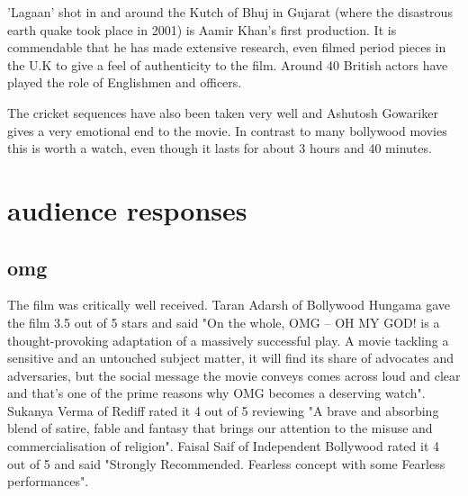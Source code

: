 \documentclass[a4paper]{article}
\begin{document}
'Lagaan' shot in and around the Kutch of Bhuj in Gujarat (where the disastrous earth quake took place in 2001) is Aamir Khan's first production. It is commendable that he has made extensive research, even filmed period pieces in the U.K to give a feel of authenticity to the film. Around 40 British actors have played the role of Englishmen and officers.

The cricket sequences have also been taken very well and Ashutosh Gowariker gives a very emotional end to the movie. In contrast to many bollywood movies this is worth a watch, even though it lasts for about 3 hours and 40 minutes.
	  
	  
	  

\section{audience responses}
\subsection{omg}
	The film was critically well received.
Taran Adarsh of Bollywood Hungama gave the film 3.5 out of 5 stars and said "On the whole, OMG – OH MY GOD! is a thought-provoking adaptation of a massively successful play. A movie tackling a sensitive and an untouched subject matter, it will find its share of advocates and adversaries, but the social message the movie conveys comes across loud and clear and that's one of the prime reasons why OMG becomes a deserving watch". Sukanya Verma of Rediff rated it 4 out of 5 reviewing "A brave and absorbing blend of satire, fable and fantasy that brings our attention to the misuse and commercialisation of religion". Faisal Saif of Independent Bollywood rated it 4 out of 5 and said "Strongly Recommended. Fearless concept with some Fearless performances".   	        
	        
\end{document}

